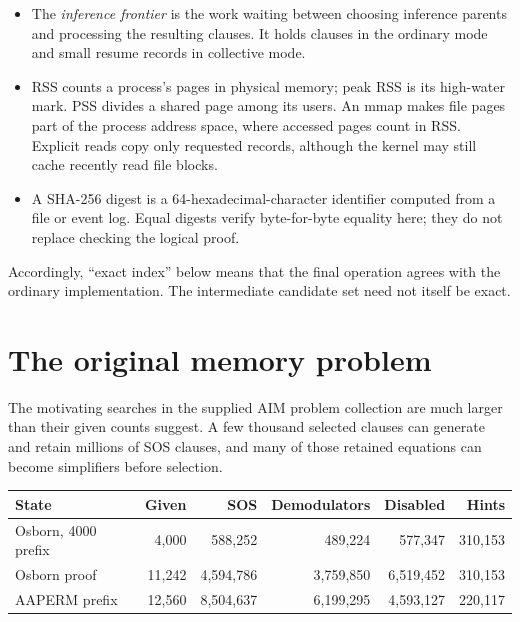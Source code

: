 \documentclass[11pt]{article}
\begin{document}
\begin{itemize}
        number representing a symbol, variable, or boundary in a serialized
        term.  A \emph{shared term pool} stores one sequence per retained clause
        so that several indexes can refer to it instead of copying it.
  \item The \emph{inference frontier} is the work waiting between choosing
        inference parents and processing the resulting clauses.  It holds
        clauses in the ordinary mode and small resume records in collective
        mode.
  \item RSS counts a process's pages in physical memory; peak RSS is its
        high-water mark.  PSS divides a shared page among its users.  An mmap
        makes file pages part of the process address space, where accessed pages
        count in RSS.  Explicit reads copy only requested records, although the
        kernel may still cache recently read file blocks.
  \item A SHA-256 digest is a 64-hexadecimal-character identifier computed from
        a file or event log.  Equal digests verify byte-for-byte equality here;
        they do not replace checking the logical proof.
\end{itemize}

Accordingly, ``exact index'' below means that the final operation agrees with
the ordinary implementation.  The intermediate candidate set need not itself
be exact.

\section{The original memory problem}

The motivating searches in the supplied AIM problem collection are much larger
than their given counts suggest.
A few thousand selected clauses can generate and retain millions of SOS
clauses, and many of those retained equations can become simplifiers before
selection.

\begin{center}
\small
\begin{tabular}{lrrrrr}
\toprule
State & Given & SOS & Demodulators & Disabled & Hints \\
\midrule
Osborn, 4000 prefix & 4,000 & 588,252 & 489,224 & 577,347 & 310,153 \\
Osborn proof & 11,242 & 4,594,786 & 3,759,850 & 6,519,452 & 310,153 \\
AAPERM prefix & 12,560 & 8,504,637 & 6,199,295 & 4,593,127 & 220,117 \\
\bottomrule
\end{tabular}
\end{center}
\end{document}

